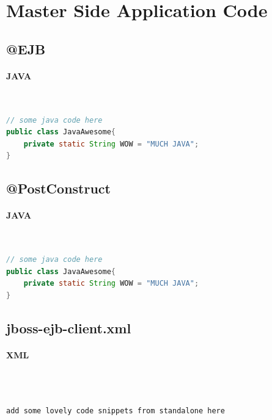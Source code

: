 \documentclass[
10pt, %
letterpaper, %
oneside, %
headinclude,footinclude, %
BCOR5mm, %
]{scrartcl}
\begin{document}
\section{Master Side Application Code}



\subsection{@EJB}


\paragraph{JAVA}~
\begin{lstlisting}[language=Java]
// some java code here
public class JavaAwesome{
	private static String WOW = "MUCH JAVA";
}
\end{lstlisting}


\subsection{@PostConstruct}


\paragraph{JAVA}~
\begin{lstlisting}[language=Java]
// some java code here
public class JavaAwesome{
	private static String WOW = "MUCH JAVA";
}
\end{lstlisting}



\subsection{jboss-ejb-client.xml}


\paragraph{XML}~
\begin{lstlisting}[language=XML]

add some lovely code snippets from standalone here


\end{lstlisting}
\end{document}
